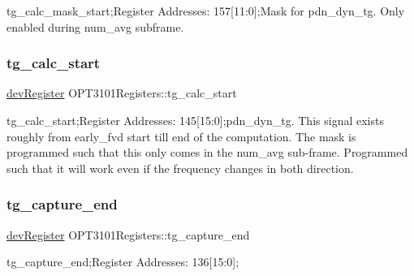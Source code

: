 tg\+\_\+calc\+\_\+mask\+\_\+start;Register Addresses\+: 157\mbox{[}11\+:0\mbox{]};Mask for pdn\+\_\+dyn\+\_\+tg. Only enabled during num\+\_\+avg subframe. 

\mbox{\label{class_o_p_t3101_registers_a7ff5cef71891b055902c660ff8eedc20}} 
\subsubsection{\texorpdfstring{tg\+\_\+calc\+\_\+start}{tg\_calc\_start}}
{\footnotesize\ttfamily \mbox{\hyperlink{classdev_register}{dev\+Register}} O\+P\+T3101\+Registers\+::tg\+\_\+calc\+\_\+start}



tg\+\_\+calc\+\_\+start;Register Addresses\+: 145\mbox{[}15\+:0\mbox{]};pdn\+\_\+dyn\+\_\+tg. This signal exists roughly from early\+\_\+fvd start till end of the computation. The mask is programmed such that this only comes in the num\+\_\+avg sub-\/frame. Programmed such that it will work even if the frequency changes in both direction. 

\mbox{\label{class_o_p_t3101_registers_aed4469099a9148f947df41aa86991b4c}} 
\subsubsection{\texorpdfstring{tg\+\_\+capture\+\_\+end}{tg\_capture\_end}}
{\footnotesize\ttfamily \mbox{\hyperlink{classdev_register}{dev\+Register}} O\+P\+T3101\+Registers\+::tg\+\_\+capture\+\_\+end}



tg\+\_\+capture\+\_\+end;Register Addresses\+: 136\mbox{[}15\+:0\mbox{]}; 

\mbox{\label{class_o_p_t3101_registers_a7b7451a76631c184d581daeaf8b3a6d3}} 
